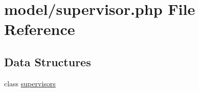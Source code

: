 \hypertarget{supervisor_8php}{}\section{model/supervisor.php File Reference}
\label{supervisor_8php}
\subsection*{Data Structures}
\begin{DoxyCompactItemize}
\item 
class \hyperlink{classsupervisors}{supervisors}
\end{DoxyCompactItemize}
